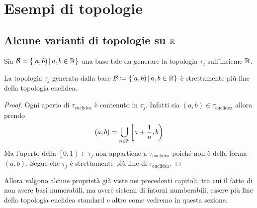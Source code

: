 \chapter{Esempi di topologie}

\section{Alcune varianti di topologie su $\mathbb{R}$}

\begin{definition}
	Sia $\mathcal{B} = \left\{\left[a,b\right) \,\middle|\, a,b \in \mathbb{R}\right\}$ una base tale da generare la topologia $\tau_j$ sull'insieme $\mathbb{R}$.
\end{definition}

\begin{theorem}
	La topologia $\tau_j$ generata dalla base $\mathcal{B} \coloneqq \left\{ \left[a,b\right) \,\middle|\, a,b\in \mathbb{R} \right\}$ è strettamente più fine della topologia euclidea. 
\end{theorem}
\begin{proof}
	Ogni aperto di $\tau_{\text{euclidea}}$ è contenuto in $\tau_j$. Infatti sia $(a,b) \in \tau_{\text{euclidea}}$ allora prendo 
	\begin{equation*}
	(a,b) = \bigcup_{n \in \mathbb{N}} \left[a + \frac{1}{n}, b\right)
	\end{equation*}
	Ma l'aperto della $\left[0,1\right) \in \tau_j$ non appartiene a $\tau_{\text{euclidea}}$ poiché non è della forma $(a,b)$. Segue che $\tau_j$ è strettamente più fine di $\tau_{\text{euclidea}}$.
\end{proof}

Allora valgono alcune proprietà già viste nei precedenti capitoli, tra cui il fatto di non avere basi numerabili, ma avere sistemi di intorni numberabili; essere più fine della topologia euclidea standard e altro come vedremo in questa sezione.

